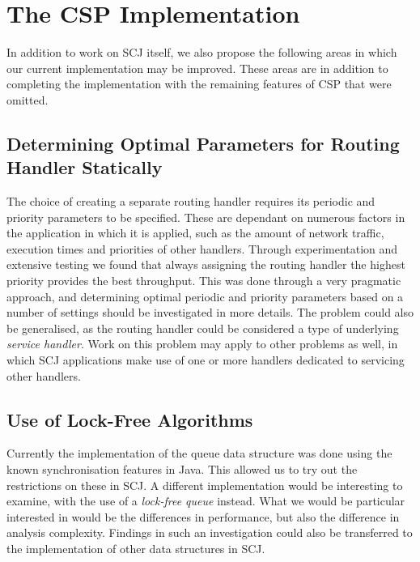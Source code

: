 

\section{The CSP Implementation} %
\label{sec:the_csp_implementation}
In addition to work on SCJ itself, we also propose the following areas in which our current implementation may be improved. These areas are in addition to completing the implementation with the remaining features of CSP that were omitted.

\subsection{Determining Optimal Parameters for Routing Handler Statically} %
\label{sub:determining_optimal_parameters_for_routing_handler_statically}
The choice of creating a separate routing handler requires its periodic and priority parameters to be specified. These are dependant on numerous factors in the application in which it is applied, such as the amount of network traffic, execution times and priorities of other handlers. Through experimentation and extensive testing we found that always assigning the routing handler the highest priority provides the best throughput. This was done through a very pragmatic approach, and determining optimal periodic and priority parameters based on a number of settings should be investigated in more details. The problem could also be generalised, as the routing handler could be considered a type of underlying \textit{service handler}. Work on this problem may apply to other problems as well, in which SCJ applications make use of one or more handlers dedicated to servicing other handlers.

\subsection{Use of Lock-Free Algorithms} %
\label{sub:lock_free_algorithms}
Currently the implementation of the queue data structure was done using the known synchronisation features in Java. This allowed us to try out the restrictions on these in SCJ. A different implementation would be interesting to examine, with the use of a \textit{lock-free queue} instead\cite{Valois94implementinglock-free}\cite{Michael:1996:SFP:248052.248106}. What we would be particular interested in would be the differences in performance, but also the difference in analysis complexity. Findings in such an investigation could also be transferred to the implementation of other data structures in SCJ.


